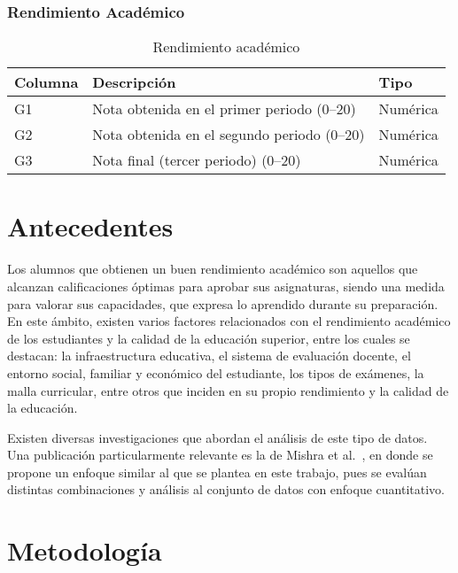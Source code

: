 \documentclass{article}
\begin{document}
\subsubsection*{Rendimiento Académico}

\begin{table}[H]
\centering
\begin{tabular}{|l|p{8cm}|l|}
\hline
\textbf{Columna} & \textbf{Descripción}                                  & \textbf{Tipo} \\ \hline
G1               & Nota obtenida en el primer periodo (0–20)             & Numérica      \\ \hline
G2               & Nota obtenida en el segundo periodo (0–20)            & Numérica      \\ \hline
G3               & Nota final (tercer periodo) (0–20)                    & Numérica      \\ \hline
\end{tabular}
\caption{Rendimiento académico}
\label{tab:rendimiento_academico}
\end{table}


\section{Antecedentes}

Los alumnos que obtienen un buen rendimiento académico son aquellos que alcanzan calificaciones óptimas para aprobar sus asignaturas, siendo una medida para valorar sus capacidades, que expresa lo aprendido durante su preparación. En este ámbito, existen varios factores relacionados con el rendimiento académico de los estudiantes y la calidad de la educación superior, entre los cuales se destacan: la infraestructura educativa, el sistema de evaluación docente, el entorno social, familiar y económico del
estudiante, los tipos de exámenes, la malla curricular, entre otros que inciden en su propio rendimiento y la calidad de la educación.


Existen diversas investigaciones que abordan el análisis de este tipo de datos. Una publicación particularmente relevante es la de Mishra et al.~\citep{mishraEA2024}, en donde se propone un enfoque similar al que se plantea en este trabajo, pues se evalúan distintas combinaciones y análisis al conjunto de datos con enfoque cuantitativo.
 

\section{Metodología}
\end{document}
